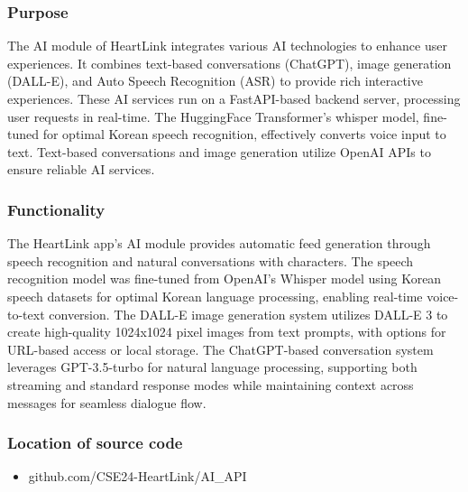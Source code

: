        \subsubsection{Purpose}
            The AI module of HeartLink integrates various AI technologies to enhance user experiences. It combines text-based conversations (ChatGPT), image generation (DALL-E), and Auto Speech Recognition (ASR) to provide rich interactive experiences. These AI services run on a FastAPI-based backend server, processing user requests in real-time. The HuggingFace Transformer's whisper model, fine-tuned for optimal Korean speech recognition, effectively converts voice input to text. Text-based conversations and image generation utilize OpenAI APIs to ensure reliable AI services.\\
            \vspace{3mm}
        \subsubsection{Functionality}
            The HeartLink app's AI module provides automatic feed generation through speech recognition and natural conversations with characters. The speech recognition model was fine-tuned from OpenAI's Whisper model using Korean speech datasets for optimal Korean language processing, enabling real-time voice-to-text conversion. The DALL-E image generation system utilizes DALL-E 3 to create high-quality 1024x1024 pixel images from text prompts, with options for URL-based access or local storage. The ChatGPT-based conversation system leverages GPT-3.5-turbo for natural language processing, supporting both streaming and standard response modes while maintaining context across messages for seamless dialogue flow.\\
            \vspace{3mm}
        \subsubsection{Location of source code}
            \begin{itemize}
                \item github.com/CSE24-HeartLink/AI\_API
            \end{itemize}

